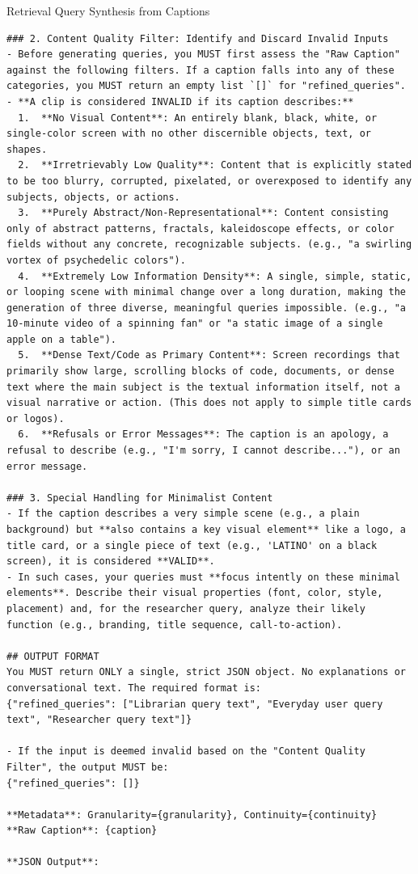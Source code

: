 \begin{promptbox}{Retrieval Query Synthesis from Captions}
\begin{lstlisting}[style=promptstyle]
### 2. Content Quality Filter: Identify and Discard Invalid Inputs
- Before generating queries, you MUST first assess the "Raw Caption" against the following filters. If a caption falls into any of these categories, you MUST return an empty list `[]` for "refined_queries".
- **A clip is considered INVALID if its caption describes:**
  1.  **No Visual Content**: An entirely blank, black, white, or single-color screen with no other discernible objects, text, or shapes.
  2.  **Irretrievably Low Quality**: Content that is explicitly stated to be too blurry, corrupted, pixelated, or overexposed to identify any subjects, objects, or actions.
  3.  **Purely Abstract/Non-Representational**: Content consisting only of abstract patterns, fractals, kaleidoscope effects, or color fields without any concrete, recognizable subjects. (e.g., "a swirling vortex of psychedelic colors").
  4.  **Extremely Low Information Density**: A single, simple, static, or looping scene with minimal change over a long duration, making the generation of three diverse, meaningful queries impossible. (e.g., "a 10-minute video of a spinning fan" or "a static image of a single apple on a table").
  5.  **Dense Text/Code as Primary Content**: Screen recordings that primarily show large, scrolling blocks of code, documents, or dense text where the main subject is the textual information itself, not a visual narrative or action. (This does not apply to simple title cards or logos).
  6.  **Refusals or Error Messages**: The caption is an apology, a refusal to describe (e.g., "I'm sorry, I cannot describe..."), or an error message.

### 3. Special Handling for Minimalist Content
- If the caption describes a very simple scene (e.g., a plain background) but **also contains a key visual element** like a logo, a title card, or a single piece of text (e.g., 'LATINO' on a black screen), it is considered **VALID**.
- In such cases, your queries must **focus intently on these minimal elements**. Describe their visual properties (font, color, style, placement) and, for the researcher query, analyze their likely function (e.g., branding, title sequence, call-to-action).

## OUTPUT FORMAT
You MUST return ONLY a single, strict JSON object. No explanations or conversational text. The required format is:
{"refined_queries": ["Librarian query text", "Everyday user query text", "Researcher query text"]}

- If the input is deemed invalid based on the "Content Quality Filter", the output MUST be:
{"refined_queries": []}

**Metadata**: Granularity={granularity}, Continuity={continuity}
**Raw Caption**: {caption}

**JSON Output**:
\end{lstlisting}
\end{promptbox}

